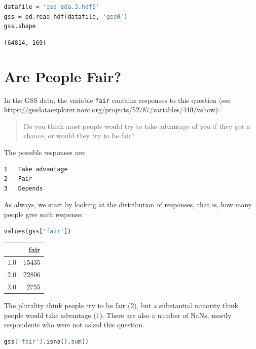 \begin{lstlisting}[language=Python,style=source]
datafile = 'gss_eda.3.hdf5'
gss = pd.read_hdf(datafile, 'gss0')
gss.shape
\end{lstlisting}

\begin{lstlisting}[style=output]
(64814, 169)
\end{lstlisting}

\hypertarget{are-people-fair}{%
\section{Are People Fair?}\label{are-people-fair}}

In the GSS data, the variable \passthrough{\lstinline!fair!} contains
responses to this question (see
\url{https://gssdataexplorer.norc.org/projects/52787/variables/440/vshow}):

\begin{quote}
Do you think most people would try to take advantage of you if they got
a chance, or would they try to be fair?
\end{quote}

The possible responses are:

\begin{lstlisting}[style=output]
1   Take advantage
2   Fair
3   Depends
\end{lstlisting}

As always, we start by looking at the distribution of responses, that
is, how many people give each response:

\begin{lstlisting}[language=Python,style=source]
values(gss['fair'])
\end{lstlisting}

\begin{tabular}{lr}
\toprule
{} &   fair \\
\midrule
1.0 &  15435 \\
2.0 &  22806 \\
3.0 &   2755 \\
\bottomrule
\end{tabular}

The plurality think people try to be fair (2), but a substantial
minority think people would take advantage (1). There are also a number
of NaNs, mostly respondents who were not asked this question.

\begin{lstlisting}[language=Python,style=source]
gss['fair'].isna().sum()
\end{lstlisting}

